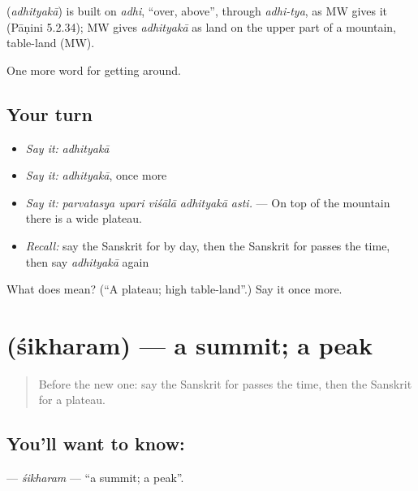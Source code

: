 \begin{cousinweb}
\textbf{} (\emph{adhityakā}) is built on \emph{adhi}, \textquotedblleft{}over, above\textquotedblright{}, through \emph{adhi-tya}, as MW gives it (Pāṇini 5.2.34); MW gives \emph{adhityakā} as land on the upper part of a mountain, table-land (MW).
\end{cousinweb}

\begin{grammarlens}[title={What you've built}]
One more word for getting around.
\end{grammarlens}

\subsection*{Your turn}
\begin{itemize}
\raggedright
  \item \emph{Say it:} \emph{adhityakā}
  \item \emph{Say it:} \emph{adhityakā}, once more
  \item \emph{Say it:} \emph{parvatasya upari viśālā adhityakā asti.} — On top of the mountain there is a wide plateau.
  \item \emph{Recall:} say the Sanskrit for by day, then the Sanskrit for passes the time, then say \emph{adhityakā} again
\end{itemize}

\begin{tcolorbox}[breakable,colback=teal!4,colframe=teal!35!black,title={Before you move on}]
What does  mean? (\textquotedblleft{}A plateau; high table-land\textquotedblright{}.) Say it once more.
\end{tcolorbox}
\section[\texorpdfstring{\sk{शिखरम्} (śikharam)}{शिखरम् (śikharam)}]{ (śikharam) — a summit; a peak}

\label{lesson:SA-C446-sikharam}



\begin{quote}
Before the new one: say the Sanskrit for passes the time, then the Sanskrit for a plateau.
\end{quote}

\subsection*{You'll want to know: }
\textbf{} — \emph{śikharam} — \textquotedblleft{}a summit; a peak\textquotedblright{}.

